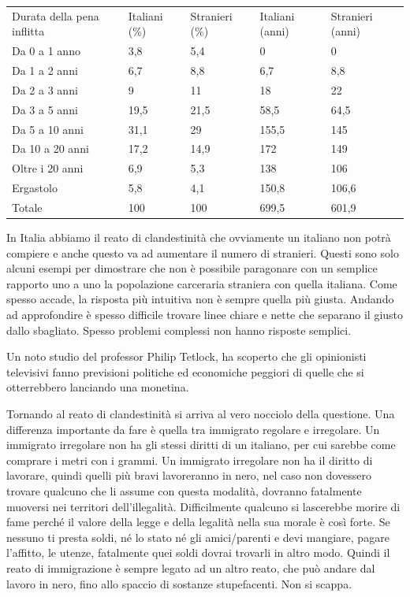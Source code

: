 \documentclass[12pt]{book} %
\begin{document}
\bigskip

\begin{flushleft}
\tablefirsthead{}
\tablehead{}
\tabletail{}
\tablelasttail{}
\begin{supertabular}{m{4.3900003cm}m{2.9659998cm}m{2.882cm}m{2.882cm}m{2.882cm}}
Durata della pena inflitta &
Italiani (\%) &
Stranieri (\%) &
Italiani (anni) &
Stranieri (anni)\\
Da 0 a 1 anno &
3,8 &
5,4 &
0 &
0\\
Da 1 a 2 anni &
6,7 &
8,8 &
6,7 &
8,8\\
Da 2 a 3 anni &
9 &
11 &
18 &
22\\
Da 3 a 5 anni &
19,5 &
21,5 &
58,5 &
64,5\\
Da 5 a 10 anni &
31,1 &
29 &
155,5 &
145\\
Da 10 a 20 anni &
17,2 &
14,9 &
172 &
149\\
Oltre i 20 anni &
6,9 &
5,3 &
138 &
106\\
Ergastolo &
5,8 &
4,1 &
150,8 &
106,6\\
Totale &
100 &
100 &
699,5 &
601,9\\
\end{supertabular}
\end{flushleft}

\bigskip

In Italia abbiamo il reato di clandestinità che ovviamente un italiano non potrà compiere e anche questo va ad aumentare
il numero di stranieri. Questi sono solo alcuni esempi per dimostrare che non è possibile paragonare con un semplice
rapporto uno a uno la popolazione carceraria straniera con quella italiana. Come spesso accade, la risposta più
intuitiva non è sempre quella più giusta. Andando ad approfondire è spesso difficile trovare linee chiare e nette che
separano il giusto dallo sbagliato. Spesso problemi complessi non hanno risposte semplici.

Un noto studio del professor Philip Tetlock, ha scoperto che gli opinionisti televisivi fanno previsioni politiche ed
economiche peggiori di quelle che si otterrebbero lanciando una monetina. 

Tornando al reato di clandestinità si arriva al vero nocciolo della questione. Una differenza importante da fare è
quella tra immigrato regolare e irregolare. Un immigrato irregolare non ha gli stessi diritti di un italiano, per cui
sarebbe come comprare i metri con i grammi. Un immigrato irregolare non ha il diritto di lavorare, quindi quelli più
bravi lavoreranno in nero, nel caso non dovessero trovare qualcuno che li assume con questa modalità, dovranno
fatalmente muoversi nei territori dell'illegalità. Difficilmente qualcuno si lascerebbe morire di
fame perché il valore della legge e della legalità nella sua morale è così forte. Se nessuno ti presta soldi, né lo
stato né gli amici/parenti e devi mangiare, pagare l'affitto, le utenze, fatalmente quei soldi dovrai trovarli in altro
modo. Quindi il reato di immigrazione è sempre legato ad un altro reato, che può andare dal lavoro in nero, fino allo
spaccio di sostanze stupefacenti. Non si scappa. 
\end{document}
